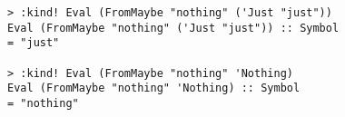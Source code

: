 \begin{repl}\begin{lstlisting}
> :kind! Eval (FromMaybe "nothing" ('Just "just"))
Eval (FromMaybe "nothing" ('Just "just")) :: Symbol
= "just"

> :kind! Eval (FromMaybe "nothing" 'Nothing)
Eval (FromMaybe "nothing" 'Nothing) :: Symbol
= "nothing"\end{lstlisting}\end{repl}
